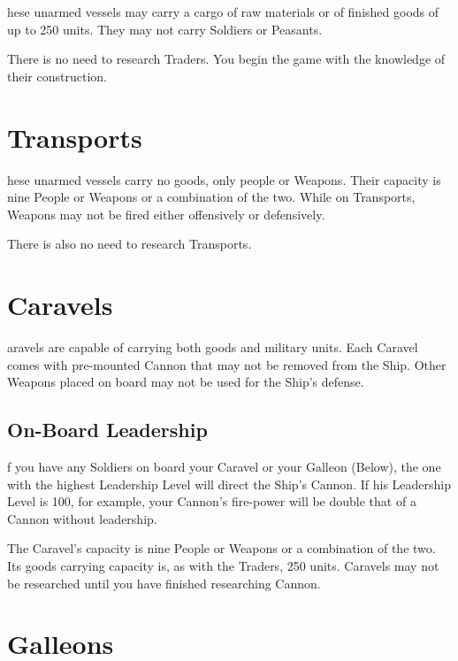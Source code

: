     
hese unarmed vessels may carry a cargo of raw materials or of finished goods of up to 250 units. They may not carry Soldiers or Peasants.

There is no need to research Traders. You begin the game with the knowledge of their construction.

\section{\textsf{Transports}}


hese unarmed vessels carry no goods, only people or Weapons. Their capacity is nine People or Weapons or a combination of the two. While on Transports, Weapons may not be fired either offensively or defensively.

There is also no need to research Transports.

\section{\textsf{Caravels}}


aravels are capable of carrying both goods and military units. Each Caravel comes with pre-mounted Cannon that may not be removed from the Ship. Other Weapons placed on board may not be used for the Ship’s defense.

\subsection{\textsf{On-Board Leadership}}

f you have any Soldiers on board your Caravel or your Galleon (Below), the one with the highest Leadership Level will direct the Ship’s Cannon. If his Leadership Level is 100, for example, your Cannon’s fire-power will be double that of a Cannon without leadership.

The Caravel’s capacity is nine People or Weapons or a combination of the two. Its goods carrying capacity is, as with the Traders, 250 units. Caravels may not be researched until you have finished researching Cannon.

\section{\textsf{Galleons}}

